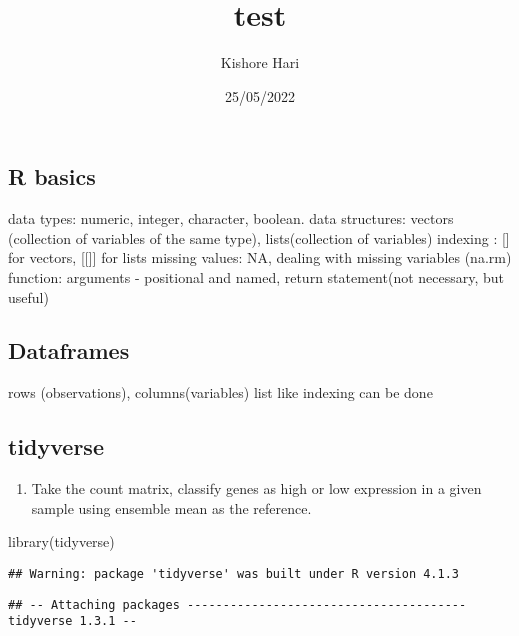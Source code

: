 \documentclass[
]{article}
\title{test}
\author{Kishore Hari}
\date{25/05/2022}
\newenvironment{Shaded}{\begin{snugshade}}{\end{snugshade}}
\newcommand{\FunctionTok}[1]{\textcolor[rgb]{0.00,0.00,0.00}{#1}}
\newcommand{\NormalTok}[1]{#1}
\providecommand{\tightlist}{%
  \setlength{\itemsep}{0pt}\setlength{\parskip}{0pt}}
\begin{document}
\maketitle

\hypertarget{r-basics}{%
\subsection{R basics}\label{r-basics}}

data types: numeric, integer, character, boolean. data structures:
vectors (collection of variables of the same type), lists(collection of
variables) indexing : {[}{]} for vectors, {[}{[}{]}{]} for lists missing
values: NA, dealing with missing variables (na.rm) function: arguments -
positional and named, return statement(not necessary, but useful)

\hypertarget{dataframes}{%
\subsection{Dataframes}\label{dataframes}}

rows (observations), columns(variables) list like indexing can be done

\hypertarget{tidyverse}{%
\subsection{tidyverse}\label{tidyverse}}

\begin{enumerate}
\def\labelenumi{\arabic{enumi}.}
\tightlist
\item
  Take the count matrix, classify genes as high or low expression in a
  given sample using ensemble mean as the reference.
\end{enumerate}

\begin{Shaded}
\begin{Highlighting}[]
\FunctionTok{library}\NormalTok{(tidyverse)}
\end{Highlighting}
\end{Shaded}

\begin{verbatim}
## Warning: package 'tidyverse' was built under R version 4.1.3
\end{verbatim}

\begin{verbatim}
## -- Attaching packages --------------------------------------- tidyverse 1.3.1 --
\end{verbatim}
\end{document}
